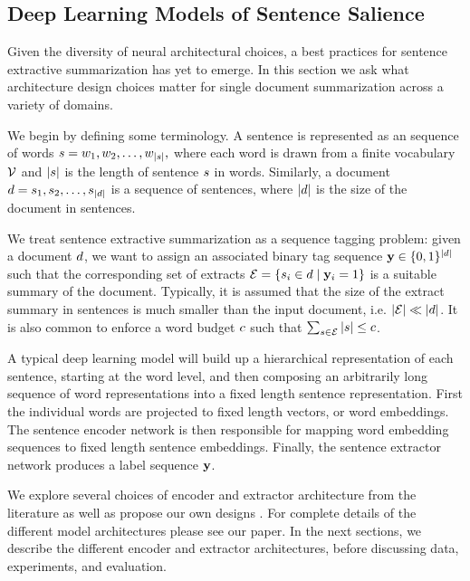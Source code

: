 

\subsection{Deep Learning Models of Sentence Salience}

 Given the diversity of neural architectural choices, a best practices
for sentence extractive summarization has yet to emerge. In this section
we ask what architecture design choices matter for single document 
summarization across a variety of domains.

We begin by defining some terminology. A sentence is represented as an
sequence of words $s = w_1, w_2, \ldots, w_{|s|},$
where each word is drawn from a finite vocabulary $\mathcal{V}$ and $|s|$ is
the length of sentence $s$ in words. Similarly, a document $d =  
s_1, s_2, \ldots, s_{|d|} $ is a sequence of sentences, where 
$|d|$ is the size of the document in sentences.  

We treat sentence extractive summarization as a sequence tagging
problem: given a document $d$, we want to assign an associated binary
tag sequence $\mathbf{y} \in \{0,1\}^{| d |}$ such that the corresponding
set of extracts $\mathcal{E} = \{s_i \in d \; | \; \mathbf{y}_i =1 \}$ is
a suitable summary
of the document. Typically, it is assumed that the size of the extract summary
in sentences is much smaller than the input document, i.e. 
$|\mathcal{E}|  \ll |d|$.
It is also common to enforce a word budget $c$ such that
$\sum_{s \in \mathcal{E}} |s| \le c$.

A typical deep learning model will build up a hierarchical representation
of each sentence, starting at the word level, and then composing an arbitrarily
long sequence of word representations into a fixed length sentence 
representation.
First the individual words are 
projected to fixed length vectors, or word embeddings. %
The sentence encoder network %
is then 
responsible for mapping word embedding sequences to fixed length sentence 
embeddings. Finally, the sentence extractor network %
produces a label 
sequence $\mathbf{y}$.

We explore several choices of encoder and extractor architecture from the 
literature \citep{cheng2016neural,nallapati2016summarunner} as well as 
propose our own designs \citep{kedzie2018deep}. For complete details of 
the different model architectures please see our paper. In the next sections,
we describe the different encoder and extractor architectures, before 
discussing data, experiments, and evaluation. 

